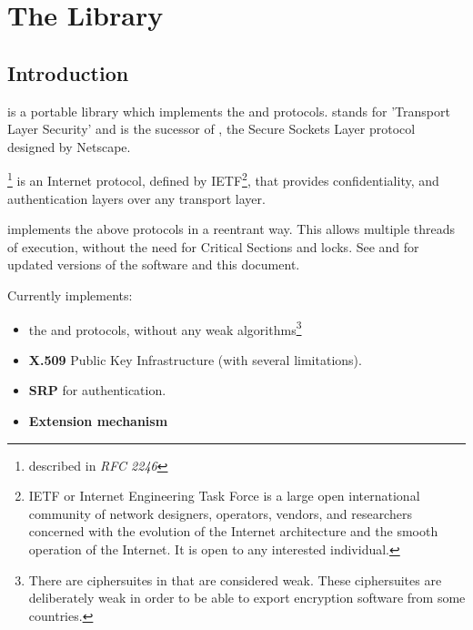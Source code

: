 \documentclass{book}
\begin{document}



\tableofcontents
\newpage
{}
\pagestyle{fancy}

\chapter{The Library}
\section{Introduction}
\par
\gnutls{} is a portable library which implements the \tlsI{} and 
\sslIII{} protocols.
\tls{} stands for 'Transport Layer Security' and is the sucessor of \ssl{}, 
the Secure Sockets Layer protocol designed by Netscape. 

\tlsI{}\footnote{described in {\it RFC 2246}} is an Internet protocol,
defined by {IETF}\footnote{IETF or Internet Engineering Task Force 
is a large open international community of network
designers, operators, vendors, and researchers concerned with the evolution of 
the Internet architecture and the smooth operation of the Internet. It is open to any interested individual.}, 
that provides confidentiality, and authentication layers over any
transport layer.

\par
\gnutls{} implements the above
protocols in a reentrant way. This allows multiple threads of
execution, without the need for Critical Sections and locks. See
and  
for updated versions of the \gnutls{} software and this document.

\par
Currently \gnutls{} implements:
\begin{itemize}
 \item the \tlsI{} and \sslIII{} protocols, without any weak algorithms\footnote{
There are ciphersuites in \tlsI{} that are considered weak. These
ciphersuites are deliberately weak in order to be able to export encryption
software from some countries.}
 \item {\bf X.509} Public Key Infrastructure (with several limitations).
 \item {\bf SRP} for \tls{} authentication.
 \item \tls{} {\bf Extension mechanism}
\end{itemize}
\end{document}
